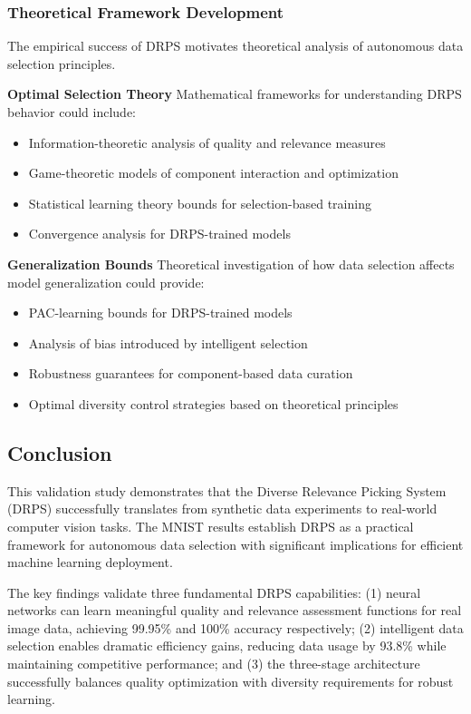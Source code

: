 \documentclass[12pt]{article}
\begin{document}
\subsubsection{Theoretical Framework Development}\label{theoretical-framework}

The empirical success of DRPS motivates theoretical analysis of autonomous data selection principles.

\textbf{Optimal Selection Theory}
Mathematical frameworks for understanding DRPS behavior could include:
\begin{itemize}
\item Information-theoretic analysis of quality and relevance measures
\item Game-theoretic models of component interaction and optimization
\item Statistical learning theory bounds for selection-based training
\item Convergence analysis for DRPS-trained models
\end{itemize}

\textbf{Generalization Bounds}
Theoretical investigation of how data selection affects model generalization could provide:
\begin{itemize}
\item PAC-learning bounds for DRPS-trained models
\item Analysis of bias introduced by intelligent selection
\item Robustness guarantees for component-based data curation
\item Optimal diversity control strategies based on theoretical principles
\end{itemize}

\subsection{Conclusion}\label{conclusion}

This validation study demonstrates that the Diverse Relevance Picking System (DRPS) successfully translates from synthetic data experiments to real-world computer vision tasks. The MNIST results establish DRPS as a practical framework for autonomous data selection with significant implications for efficient machine learning deployment.

The key findings validate three fundamental DRPS capabilities: (1) neural networks can learn meaningful quality and relevance assessment functions for real image data, achieving 99.95\% and 100\% accuracy respectively; (2) intelligent data selection enables dramatic efficiency gains, reducing data usage by 93.8\% while maintaining competitive performance; and (3) the three-stage architecture successfully balances quality optimization with diversity requirements for robust learning.
\end{document}
